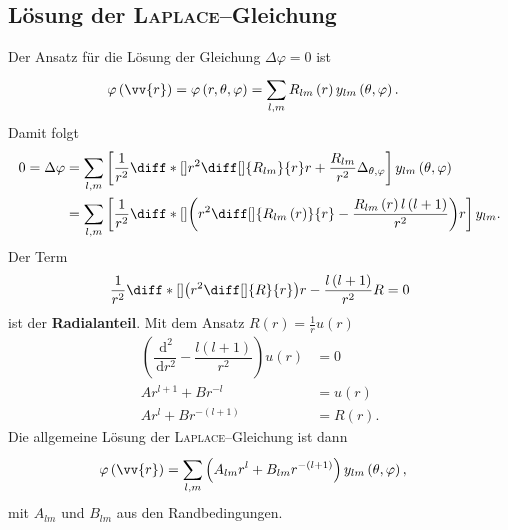 \documentclass[a4paper,12pt]{article}
\newcommand{\td}{\,\text{d}}
\numberwithin{equation}{section}
\begin{document}
\subsection{Lösung der \textsc{Laplace}--Gleichung}
Der Ansatz für die Lösung der Gleichung $\Delta \varphi =0$ ist
\begin{align} 
        \varphi \left(\vv{r}\right)&=\varphi \left(r,\theta ,\varphi \right)=\sum_{l,m}^{}R_{l m}\left(r\right)y_{l m}\left(\theta ,\varphi \right)
.\end{align} 
Damit folgt
\begin{align} 
        0=\Delta \varphi &=\sum_{l,m}^{}\left[\dfrac{1}{r^2}\diff*[]{r^2\diff[]{R_{l m}}{r}}{r}+\dfrac{R_{l m}}{r^2}\Delta _{\theta ,\varphi }\right]y_{l m}\left(\theta ,\varphi \right)\\
                            &=\sum_{l,m}^{}\left[\dfrac{1}{r^2}\diff*[]{\left(r^2\diff[]{R_{l m}\left(r\right)}{r}-\dfrac{R_{l m}\left(r\right)l\left(l+1\right)}{r^2}\right)}{r}\right]y_{l m}
.\end{align} 
Der Term 
\begin{align} 
        \dfrac{1}{r^2}\diff*[]{\left(r^2\diff[]{R}{r}\right)}{r}-\dfrac{l\left(l+1\right)}{r^2}R=0
\end{align} 
ist der \textbf{Radialanteil}. Mit dem Ansatz $R\left(r\right)=\tfrac{1}{r}u\left(r\right)$ 
\begin{align} 
        \left(\dfrac{\td ^2}{\td r^2}-\dfrac{l\left(l+1\right)}{r^2}\right)u\left(r\right)&=0\\
        Ar^{l+1}+Br^{-l}&=u\left(r\right)\\
        Ar^l+Br^{-\left(l+1\right)}&=R\left(r\right)
.\end{align} 
Die allgemeine Lösung der \textsc{Laplace}--Gleichung ist dann
\begin{align} 
        \varphi \left(\vv{r}\right)&=\sum_{l,m}^{}\left(A_{l m}r^l+B_{l m}r^{-\left(l+1\right)}\right)y_{l m}\left(\theta ,\varphi \right)
,\end{align} 
mit $A_{l m}$ und $B_{l m}$ aus den Randbedingungen.
\end{document}
